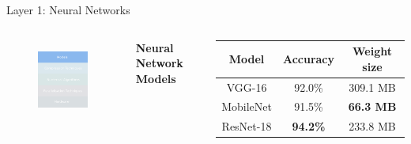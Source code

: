 \documentclass[xcolor=dvipsnames]{beamer}
\begin{document}
\begin{frame}{Layer 1: Neural Networks}

\begin{columns}

\begin{figure}
    \centering
    \includegraphics[width=3.5cm]{images/models.pdf}
    \label{fig:inference-stack-models}
\end{figure}


\textbf{Neural Network Models}


\begin{table}[]
    \centering
    \begin{tabular}{c|c|c}
        Model & Accuracy & Weight size \\
        \hline
        VGG-16 & 92.0\% & 309.1 MB \\
        MobileNet & 91.5\% & \textbf{66.3 MB}\\
        ResNet-18 & \textbf{94.2\%} & 233.8 MB \\
    \end{tabular}
\end{table}

\end{columns}


\end{frame}






\end{document}
